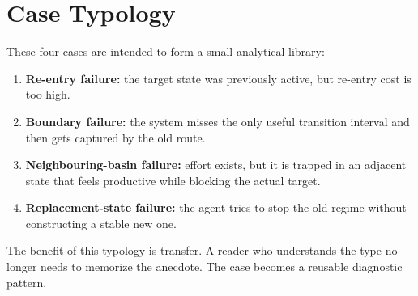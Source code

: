 \section{Case Typology}

These four cases are intended to form a small analytical library:
\begin{enumerate}[nosep]
  \item \textbf{Re-entry failure:} the target state was previously active, but
        re-entry cost is too high.
  \item \textbf{Boundary failure:} the system misses the only useful transition
        interval and then gets captured by the old route.
  \item \textbf{Neighbouring-basin failure:} effort exists, but it is trapped
        in an adjacent state that feels productive while blocking the actual
        target.
  \item \textbf{Replacement-state failure:} the agent tries to stop the old
        regime without constructing a stable new one.
\end{enumerate}

The benefit of this typology is transfer. A reader who understands the type no
longer needs to memorize the anecdote. The case becomes a reusable diagnostic
pattern.
